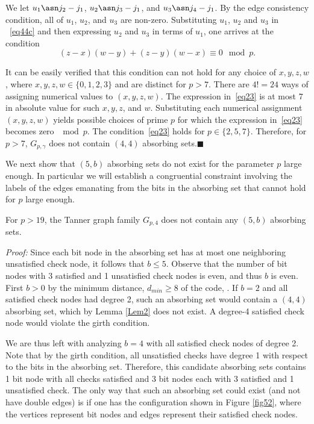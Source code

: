 We let $u_1 \asn j_2-j_1$, $u_2 \asn j_3-j_1$, and $u_3 \asn
j_4-j_1$. By the edge consistency condition, all of $u_1$, $u_2$,
and $u_3$ are non-zero. Substituting $u_1$, $u_2$ and $u_3$ in
~\eqref{eq44c} and then expressing $u_2$ and $u_3$ in terms of
$u_1$, one arrives at the condition
\begin{equation}\label{eq23}
(z-x)(w-y)+(z-y)(w-x) \equiv 0 \mod p.
\end{equation}

It can be easily verified that this condition can not hold for any
choice of $x,y,z,w$, where $x,y,z,w \in \{0,1,2,3 \}$ and are
distinct for $p>7$. There are $4!=24$ ways of assigning numerical
values to $(x,y,z,w)$. The expression in~\eqref{eq23} is at most $7$
in absolute value for such $x,y,z$, and $w$.  Substituting each
numerical assignment $(x,y,z,w)$ yields possible choices of prime
$p$ for which the expression in~\eqref{eq23} becomes zero $\mod p$.
The condition~\eqref{eq23} holds for $p \in \{2,5,7\}$. Therefore,
for $p>7$, $G_{p,\gamma}$ does not contain $(4,4)$ absorbing
sets.\hfill$\blacksquare$


 We next show that $(5,b)$
absorbing sets do not exist for the parameter $p$ large enough. In
particular we will establish a congruential constraint involving the
labels of the edges emanating from the bits in the absorbing set
that cannot hold for $p$ large enough.
\begin{lemma}\label{Lem3} For $p>19$, the Tanner graph family $G_{p,4}$
does not contain any $(5,b)$ absorbing sets.
 \end{lemma}

\noindent \textit{Proof:} Since each bit node in the absorbing set
has at most one neighboring unsatisfied check node, it follows that
$b \leq 5$. Observe that the number of bit nodes with 3 satisfied
and 1 unsatisfied check nodes is even, and thus $b$ is even. First
$b>0$ by the minimum distance, $d_{min}\geq 8$ of the code,
\cite{helles}. If $b=2$ and all satisfied check nodes had degree 2,
such an absorbing set would contain a $(4,4)$ absorbing set, which
by Lemma \ref{Lem2} does not exist. A degree-4 satisfied check node
would violate the girth condition.


We are thus left with analyzing $b=4$ with all satisfied check
nodes of degree 2. Note that by the girth condition, all
unsatisfied checks have degree 1 with respect to the bits in the
absorbing set. Therefore, this candidate absorbing sets contains 1
bit node with all checks satisfied and 3 bit nodes each with 3
satisfied and 1 unsatisfied check. The only way that such an
absorbing set could exist (and not have double edges) is if one
has the configuration shown in Figure \ref{fig52}, where the
vertices represent bit nodes and edges represent their satisfied
check nodes.

